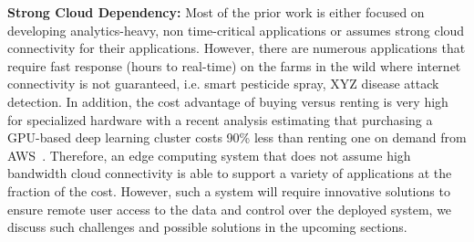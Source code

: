 
\noindent
\textbf{Strong Cloud Dependency:}
Most of the prior work is either focused on developing analytics-heavy, non time-critical applications or assumes strong cloud connectivity for their applications.
However, there are numerous applications that require fast response (hours to real-time) on the farms in the wild where internet connectivity is not guaranteed, i.e. smart pesticide spray, XYZ disease attack detection. 
In addition, the cost advantage of buying versus renting is very high for specialized hardware with a recent analysis estimating that purchasing a GPU-based deep learning cluster costs 90\% less than renting one on demand from AWS~\cite{deep-learning}.
Therefore, an edge computing system that does not assume high bandwidth cloud connectivity is able to support a variety of applications at the fraction of the cost. 
However, such a system will require innovative solutions to ensure remote user access to the data and control over the deployed system, we discuss such challenges and possible solutions in the upcoming sections. 



